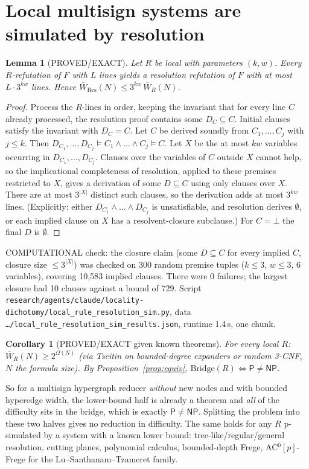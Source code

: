 \documentclass[11pt]{article}
\newtheorem{lemma}[theorem]{Lemma}
\newtheorem{corollary}[theorem]{Corollary}
\newcommand{\Pc}{\mathsf{P}}
\newcommand{\NP}{\mathsf{NP}}
\newcommand{\Wb}{\overline W}
\begin{document}
\section{Local multisign systems are simulated by resolution}
\begin{lemma}[PROVED/EXACT]\label{lem:local}
Let $R$ be local with parameters $(k,w)$. Every $R$-refutation of $F$ with
$L$ lines yields a resolution refutation of $F$ with at most
$L\cdot 3^{kw}$ lines. Hence $\Wb_{\mathrm{Res}}(N)\le 3^{kw}\,\Wb_R(N)$.
\end{lemma}
\begin{proof}
Process the $R$-lines in order, keeping the invariant that for every line $C$
already processed, the resolution proof contains some $D_C\subseteq C$.
Initial clauses satisfy the invariant with $D_C=C$. Let $C$ be derived soundly from
$C_1,\dots,C_j$ with $j\le k$. Then $D_{C_1},\dots,D_{C_j}\models C_1\wedge\dots\wedge C_j\models C$.
Let $X$ be the at most $kw$ variables occurring in $D_{C_1},\dots,D_{C_j}$.
Clauses over the variables of $C$ outside $X$ cannot help, so the
implicational completeness of resolution, applied to these premises restricted to $X$, gives a derivation
of some $D\subseteq C$ using only clauses over $X$. There are at most $3^{|X|}$ distinct
such clauses, so the derivation adds at most $3^{kw}$ lines. (Explicitly: either
$D_{C_1}\wedge\dots\wedge D_{C_j}$ is unsatisfiable, and resolution derives $\emptyset$,
or each implied clause on $X$ has a resolvent-closure subclause.)
For $C=\bot$ the final $D$ is $\emptyset$.
\end{proof}
\noindent COMPUTATIONAL check: the closure claim (some $D\subseteq C$ for
every implied $C$, closure size $\le3^{|X|}$) was checked on 300 random
premise tuples ($k\le3$, $w\le3$, 6 variables), covering 10{,}583 implied clauses. There were 0
failures; the largest closure had 10 clauses against a bound of 729.
Script \texttt{research/agents/claude/locality-dichotomy/local\_rule\_resolution\_sim.py},
data \texttt{\ldots/local\_rule\_resolution\_sim\_results.json}, runtime 1.4\,s, one chunk.

\begin{corollary}[PROVED/EXACT given known theorems]
For every local $R$: $\Wb_R(N)\ge 2^{\Omega(N)}$ (via Tseitin on bounded-degree expanders or random 3-CNF,
$N$ the formula size). By Proposition~\ref{prop:equiv},
$\mathrm{Bridge}(R)\iff\Pc\ne\NP$.
\end{corollary}

So for a multisign hypergraph reducer \emph{without} new nodes and with
bounded hyperedge width, the lower-bound half is already a theorem and
\emph{all} of the difficulty sits in the bridge, which is exactly $\Pc\ne\NP$.
Splitting the problem into these two halves gives no reduction in difficulty.
The same holds for any $R$ p-simulated by a system with a known
lower bound: tree-like/regular/general resolution, cutting planes,
polynomial calculus, bounded-depth Frege, AC$^0[p]$-Frege for the Lu--Santhanam--Tzameret family.
\end{document}
